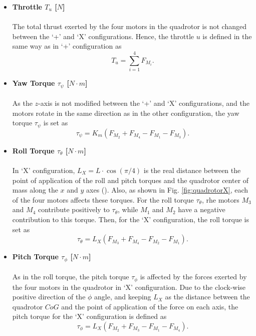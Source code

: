 \begin{itemize}
\item \textbf{Throttle $T_u$ [$N$]}\\\\
The total thrust exerted by the four motors in the quadrotor is not changed between the `+' and `X' configurations. Hence, the throttle $u$ is defined in the same way as in `+' configuration as
\begin{equation}
\label{ec:ux}
T_u = \sum_{i=1}^{4}F_{M_i}.
\end{equation}

\item \textbf{Yaw Torque $\tau_{\psi}$ [$N\cdot m$]}\\\\
As the $z$-axis is not modified between the `+' and `X' configurations, and the motors rotate in the same direction as in the other configuration, the yaw torque $\tau_\psi$ is set as
\begin{equation}
\label{ec:taupsix}
\tau_{\psi} = K_{m}(F_{M_2} + F_{M_4} - F_{M_1} - F_{M_3}).
\end{equation}

\item \textbf{Roll Torque $\tau_{\theta}$ [$N\cdot m$]}\\\\
In `X' configuration, $L_{X} = L\cdot \cos\left(\pi/4\right)$ is the real distance between the point of application of the roll and pitch torques and the quadrotor center of mass along the $x$ and $y$ axes (\cite{Faessler2016}). Also, as shown in Fig. \ref{fig:quadrotorX}, each of the four motors affects these torques. For the roll torque $\tau_{\theta}$, rhe motors $M_3$ and $M_4$ contribute positively to $\tau_\theta$, while $M_1$ and $M_2$ have a negative contribution to this torque. Then, for the `X' configuration, the roll torque is set as
\begin{equation}
\label{ec:tauthetax}
\tau_{\theta} = L_{X}(F_{M_3}+F_{M_4}-F_{M_2}-F_{M_1}).
\end{equation}

\item \textbf{Pitch Torque $\tau_{\phi}$ [$N\cdot m$]}\\\\
As in the roll torque, the pitch torque $\tau_{\phi}$ is affected by the forces exerted by the four motors in the quadrotor in `X' configuration. Due to the clock-wise positive direction of the $\phi$ angle, and keeping $L_X$ as the distance between the quadrotor $CoG$ and the point of application of the force on each axis, the pitch torque for the `X' configuration is defined as
\begin{equation}
\label{ec:tauphix}
\tau_{\phi} = L_{X}(F_{M_2}+F_{M_3}-F_{M_1}-F_{M_4}).
\end{equation}

\end{itemize}





